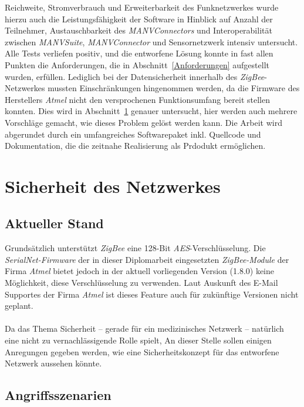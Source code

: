 Reichweite, Stromverbrauch und Erweiterbarkeit des Funknetzwerkes wurde hierzu auch die Leistungsfähigkeit der 
Software in Hinblick auf Anzahl der Teilnehmer, Austauschbarkeit des \emph{MANVConnectors} und Interoperabilität
zwischen \emph{MANVSuite}, \emph{MANVConnector} und Sensornetzwerk intensiv untersucht. Alle Tests verliefen
positiv, und die entworfene Lösung konnte in fast allen Punkten die Anforderungen, die in Abschnitt~\ref{Anforderungen}
aufgestellt wurden, erfüllen. Lediglich bei der Datensicherheit innerhalb des \emph{ZigBee}-Netzwerkes mussten
Einschränkungen hingenommen werden, da die Firmware des Herstellers \emph{Atmel} nicht den versprochenen
Funktionsumfang bereit stellen konnten. Dies wird in Abschnitt~\ref{Sicherheit} genauer untersucht, hier werden
auch mehrere Vorschläge gemacht, wie dieses Problem gelöst werden kann. Die Arbeit wird abgerundet durch ein
umfangreiches Softwarepaket inkl. Quellcode und Dokumentation, die die zeitnahe Realisierung als Prdodukt ermöglichen.

\section{Sicherheit des Netzwerkes}
\label{Sicherheit}
\subsection{Aktueller Stand}
Grundsätzlich unterstützt \emph{ZigBee} eine 128-Bit \emph{AES}-Verschlüsselung. Die \emph{SerialNet-Firmware} der in 
dieser Diplomarbeit eingesetzten \emph{ZigBee-Module} der Firma \emph{Atmel} bietet jedoch in der aktuell vorliegenden 
Version (1.8.0) keine Möglichkeit, diese Verschlüsselung zu verwenden. Laut Auskunft des E-Mail Supportes der Firma 
\emph{Atmel} ist dieses Feature auch für zukünftige Versionen nicht geplant.\\
\\
Da das Thema Sicherheit -- gerade für ein medizinisches Netzwerk -- natürlich eine nicht zu vernachlässigende Rolle spielt,
An dieser Stelle sollen einigen Anregungen gegeben werden, wie eine Sicherheitskonzept für das entworfene Netzwerk aussehen 
könnte.

\subsection{Angriffsszenarien}


